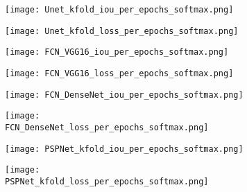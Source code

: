 \begin{figure} [!h]
	\centering
	\begin{subfigure}[b]{0.47\textwidth}
	 \centering		\texttt{[image: Unet\_kfold\_iou\_per\_epochs\_softmax.png]}	\caption{}
	 \label{fig:unet_accuracy_metric}
	\end{subfigure}
	\hfill	
	\begin{subfigure}[b]{0.47\textwidth}
	 \centering
	 \texttt{[image: Unet\_kfold\_loss\_per\_epochs\_softmax.png]}
	 \caption{}
	 \label{fig:unet_loss_metric}
	\end{subfigure}
	\hfill
	\begin{subfigure}[b]{0.47\textwidth}
		\centering
		\texttt{[image: FCN\_VGG16\_iou\_per\_epochs\_softmax.png]}
		\caption{}
		\label{fig:vgg16_accuracy_metric}
	\end{subfigure}		
	\hfill
	\begin{subfigure}[b]{0.47\textwidth}
		\centering
		\texttt{[image: FCN\_VGG16\_loss\_per\_epochs\_softmax.png]}
		\caption{}
		\label{fig:vgg16_loss_metric}
	\end{subfigure}
	\hfill
	\begin{subfigure}[b]{0.49\textwidth}
		\centering
		\texttt{[image: FCN\_DenseNet\_iou\_per\_epochs\_softmax.png]}
		\caption{}
		\label{fig:fcn_densenet_accuracy_metric}
	\end{subfigure}
	\hfill
	\begin{subfigure}[b]{0.49\textwidth}
		\centering
		\texttt{[image: FCN\_DenseNet\_loss\_per\_epochs\_softmax.png]}
		\caption{}
		\label{fig:fcn_densenet_loss_metric}
	\end{subfigure}
	\hfill
	\begin{subfigure}[b]{0.49\textwidth}
		\centering
		\texttt{[image: PSPNet\_kfold\_iou\_per\_epochs\_softmax.png]}
		\caption{}
		\label{fig:psp_accuracy_metric}
	\end{subfigure}
	\hfill
	\begin{subfigure}[b]{0.47\textwidth}
		\centering
		\texttt{[image: PSPNet\_kfold\_loss\_per\_epochs\_softmax.png]}
		\caption{}
		\label{fig:psp_loss_metric}
	\end{subfigure}

\end{figure}
